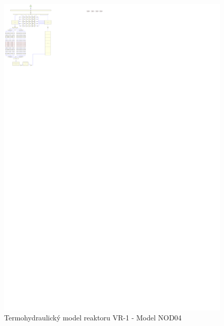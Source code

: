\begin{figure}
	\centering
	\includegraphics[width=\textwidth, trim={0cm 214cm 148cm 0cm}, clip]{./07_prilohy/prehled_modelu/nod04.pdf}
	\caption{Termohydraulický model reaktoru VR-1 - Model NOD04}
\end{figure}
